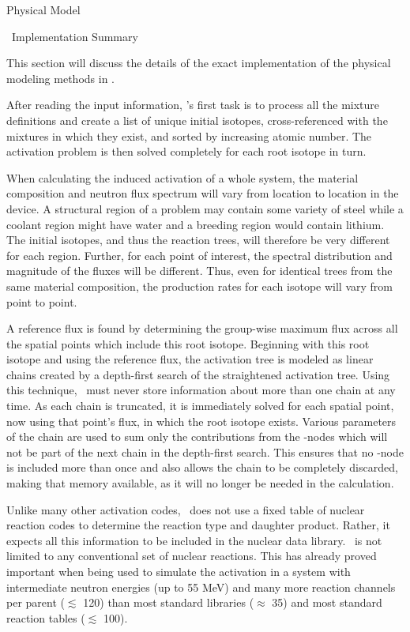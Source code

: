 \begin{chapter}{Physical Model\label{chap:physical}}
\begin{section}{\ALARA\  Implementation Summary\label{sec:physical.alara}}
  
  This section will discuss the details of the exact implementation of
  the physical modeling methods in \ALARA.
  
  After reading the input information, \ALARA's first task is to
  process all the mixture definitions and create a list of unique
  initial isotopes, cross-referenced with the mixtures in which they
  exist, and sorted by increasing atomic number.  The activation
  problem is then solved completely for each root isotope in turn.
  
  When calculating the induced activation of a whole system, the
  material composition and neutron flux spectrum will vary from
  location to location in the device.  A structural region of a
  problem may contain some variety of steel while a coolant region
  might have water and a breeding region would contain lithium.  The
  initial isotopes, and thus the reaction trees, will therefore be
  very different for each region.  Further, for each point of
  interest, the spectral distribution and magnitude of the fluxes will
  be different.  Thus, even for identical trees from the same material
  composition, the production rates for each isotope will vary from
  point to point.
  
  A reference flux is found by determining the group-wise maximum flux
  across all the spatial points which include this root isotope.
  Beginning with this root isotope and using the reference flux, the
  activation tree is modeled as linear chains created by a depth-first
  search of the straightened activation tree.  Using this technique,
  \ALARA\ must never store information about more than one chain at
  any time.  As each chain is truncated, it is immediately solved for
  each spatial point, now using that point's flux, in which the root
  isotope exists.  Various parameters of the chain are used to sum
  only the contributions from the \pc-nodes which will not be part of
  the next chain in the depth-first search.  This ensures that no
  \pc-node is included more than once and also allows the chain to be
  completely discarded, making that memory available, as it will no
  longer be needed in the calculation.
  
  Unlike many other activation codes, \ALARA\ does not use a fixed
  table of nuclear reaction codes to determine the reaction type and
  daughter product.  Rather, it expects all this information to be
  included in the nuclear data library.  \ALARA\ is not limited to any
  conventional set of nuclear reactions.  This has already proved
  important when being used to simulate the activation in a system
  with intermediate neutron energies (up to 55 MeV)\cite{UKA.Thesis}
  and many more reaction channels per parent ($\lesssim$ 120) than
  most standard libraries ($\approx$ 35) and most standard reaction
  tables ($\lesssim$ 100).
  

\end{section}
\end{chapter}
